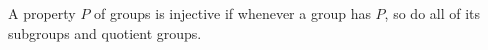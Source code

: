 A property $P$ of groups is injective if whenever a group has $P$, so do all of its subgroups and quotient groups.
